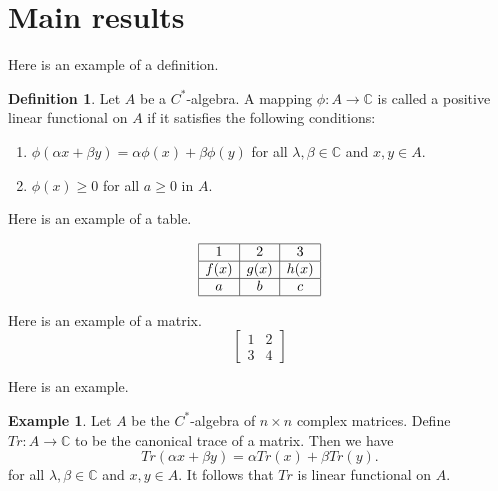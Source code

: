 \documentclass[12pt, reqno]{amsart}
\theoremstyle{definition}
\newtheorem{definition}[theorem]{Definition}
\newtheorem{example}[theorem]{Example}
\theoremstyle{remark}
\numberwithin{equation}{section}
\begin{document}
\section{Main results}

Here is an example of a definition. 

\begin{definition} Let $A$ be a $C^*$-algebra. A mapping
$\phi :A\rightarrow \mathbb{C} $ is
called a positive linear functional on $A$ if it satisfies the following conditions:

\begin{enumerate}

\item $\phi(\alpha x+\beta y)=\alpha \phi(x)+\beta\phi(y)$ for all $\lambda ,\beta \in  \mathbb{C}$ and $x,y\in A$.

\item $\phi(x)\geq 0$ for all $a\geq 0$ in $A$.
\end{enumerate}
\end{definition}


Here is an example of a table.

\begin{table}[ht]
\caption{}\label{eqtable}
\renewcommand\arraystretch{1.5}
\noindent\[
\begin{array}{|c|c|c|}
\hline
1&2&3\\
\hline f(x)&g(x)&h(x)\\
\hline a&b&c\\
\hline
\end{array}
\]
\end{table}

Here is an example of a matrix.
\begin{equation*}
\begin{bmatrix}
1 & 2 \\
3 &  4
\end{bmatrix}
\end{equation*}


Here is an example.


\begin{example} Let $A$ be the $C^*$-algebra of $n\times n$ complex matrices. Define $Tr: A\rightarrow \mathbb{C}$ to be the canonical trace of a matrix. Then we have
\begin{equation}\label{2.1}
Tr(\alpha x+\beta y)=\alpha Tr(x)+\beta Tr(y).
\end{equation}
for all $\lambda ,\beta \in  \mathbb{C}$ and $x,y\in A$. It follows that $Tr$ is linear functional on $A$.
\end{example}
\end{document}
